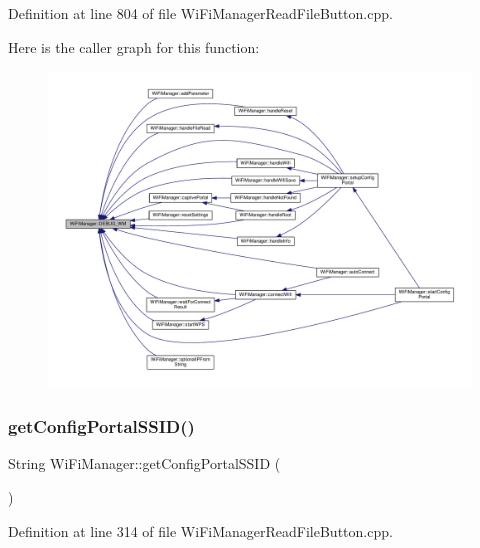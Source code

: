 Definition at line 804 of file Wi\+Fi\+Manager\+Read\+File\+Button.\+cpp.

Here is the caller graph for this function\+:\nopagebreak
\begin{figure}[H]
\begin{center}
\leavevmode
\includegraphics[width=350pt]{class_wi_fi_manager_ae5f595c670ccbcf9a191baf50f5c7c26_icgraph}
\end{center}
\end{figure}
\mbox{\label{class_wi_fi_manager_a157dc79b810f8f8d338a6120b13f5c94}} 
\subsubsection{\texorpdfstring{get\+Config\+Portal\+S\+S\+I\+D()}{getConfigPortalSSID()}}
{\footnotesize\ttfamily String Wi\+Fi\+Manager\+::get\+Config\+Portal\+S\+S\+ID (\begin{DoxyParamCaption}{ }\end{DoxyParamCaption})}



Definition at line 314 of file Wi\+Fi\+Manager\+Read\+File\+Button.\+cpp.

\mbox{\label{class_wi_fi_manager_a40f123fd290c3e331c9785d19a88f3b8}} 
